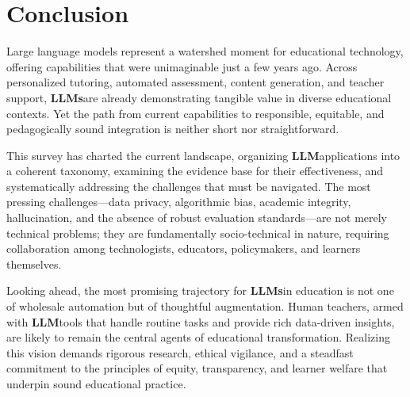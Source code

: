 \documentclass[preprint,12pt]{article}
\newcommand{\LLM}{\textbf{LLM}}
\newcommand{\LLMs}{\textbf{LLMs}}
\theoremstyle{mystyle}
\begin{document}
\section{Conclusion}
\label{sec:conclusion}

Large language models represent a watershed moment for educational technology, offering capabilities that were unimaginable just a few years ago. Across personalized tutoring, automated assessment, content generation, and teacher support, \LLMs are already demonstrating tangible value in diverse educational contexts. Yet the path from current capabilities to responsible, equitable, and pedagogically sound integration is neither short nor straightforward.

This survey has charted the current landscape, organizing \LLM applications into a coherent taxonomy, examining the evidence base for their effectiveness, and systematically addressing the challenges that must be navigated. The most pressing challenges---data privacy, algorithmic bias, academic integrity, hallucination, and the absence of robust evaluation standards---are not merely technical problems; they are fundamentally socio-technical in nature, requiring collaboration among technologists, educators, policymakers, and learners themselves.

Looking ahead, the most promising trajectory for \LLMs in education is not one of wholesale automation but of thoughtful augmentation. Human teachers, armed with \LLM tools that handle routine tasks and provide rich data-driven insights, are likely to remain the central agents of educational transformation. Realizing this vision demands rigorous research, ethical vigilance, and a steadfast commitment to the principles of equity, transparency, and learner welfare that underpin sound educational practice.



\end{document}
